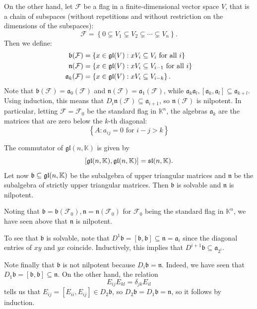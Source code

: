 \documentclass{report}
\begin{document}
On the other hand, let $\mathcal F$ be a flag in a finite-dimensional vector space $V$, that is a chain of subspaces (without repetitions and without restriction on the dimensions of the subspaces):
\[
\mathcal F = \left\{ 0 \subsetneq V_1 \subsetneq V_2 \subsetneq \cdots \subsetneq V_n \right\}.
\]
Then we define:
\begin{align*}
    \mathfrak b(\mathcal F) &= \left\{ x \in \operatorname{{\mathfrak{gl}}}(V) : x V_i \subseteq V_i \text{ for all } i \right\}\\
    \mathfrak n(\mathcal F) &= \left\{ x \in \operatorname{{\mathfrak{gl}}}(V) : x V_i \subseteq V_{i-1} \text{ for all } i \right\}\\
    \mathfrak a_k(\mathcal F) &= \left\{ x \in \operatorname{{\mathfrak{gl}}}(V) : x V_i \subseteq V_{i - k} \right\}.
\end{align*}
Note that $\mathfrak b(\mathcal F) = \mathfrak a_0(\mathcal F)$ and $\mathfrak n(\mathcal F) = \mathfrak a_1(\mathcal F)$, while $\mathfrak a_{k} \mathfrak a_l, [\mathfrak a_k, \mathfrak a_l] \subseteq \mathfrak a_{k+l}$.
Using induction, this means that $D_i \mathfrak n(\mathcal F) \subseteq \mathfrak a_{i+1}$, 
so $\mathfrak n(\mathcal F)$ is nilpotent.
In particular, letting $\mathcal F = \mathcal F_0$ be the standard flag in $\mathbb K^n$, the algebras $\mathfrak a_k$ are the matrices that are zero below the $k$-th diagonal:
\[
\left\{ A : a_{ij} = 0 \text{ for } i - j > k
\right\}
\]
\begin{example}
    The commutator of $\mathfrak{gl}(n, \mathbb K)$ is given by
    \[
    [\operatorname{{\mathfrak{gl}}}(n, \mathbb K), \operatorname{{\mathfrak{gl}}}(n, \mathbb K)] = \operatorname{{\mathfrak{sl}}}(n, \mathbb K).
    \]
    Let now $\mathfrak b \subseteq \operatorname{{\mathfrak{gl}}}(n, \mathbb K)$ be the subalgebra of upper triangular matrices and $\mathfrak n$ be the subalgebra of strictly upper triangular matrices.
    Then $\mathfrak b$ is solvable and $\mathfrak n$ is nilpotent.

    Noting that $\mathfrak b = \mathfrak b (\mathcal F_0), \mathfrak n = \mathfrak n(\mathcal F_0)$ for $\mathcal F_0$ being the standard flag in $\mathbb K^n$, we have seen above that $\mathfrak n$ is nilpotent.
    
    To see that $\mathfrak b$ is solvable, note that $D^1 \mathfrak b = [\mathfrak b, \mathfrak b] \subseteq \mathfrak n = \mathfrak a_i$ since the diagonal entries of $xy$ and $yx$ coincide.
    Inductively, this implies that $D^{i+1} \mathfrak b \subseteq \mathfrak a_{2^i}$.

    Note finally that $\mathfrak b $ is not nilpotent because $D_i \mathfrak b = \mathfrak n$.
    Indeed, we have seen that $D_1 \mathfrak b = [\mathfrak b, \mathfrak b] \subseteq \mathfrak n$.
    On the other hand, the relation 
    \[
    E_{ij} E_{kl} = \delta_{jk} E_{il}
    \]
    tells us that $E_{ij} = [E_{ii}, E_{ij}] \in D_2 \mathfrak b$, so $D_2 \mathfrak b = D_1 \mathfrak b = \mathfrak n$, so it follows by induction.
\end{example}
\end{document}
